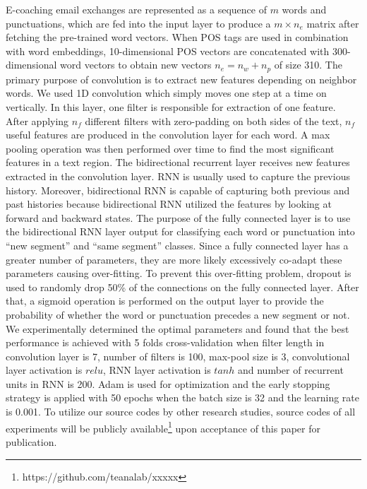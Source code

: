 \documentclass{amia}
\begin{document}
E-coaching email exchanges are represented as a sequence of $m$ words and punctuations, which are fed into the input layer to produce a $m \times n_e$ matrix after fetching the pre-trained word vectors. When POS tags are used in combination with word embeddings, 10-dimensional POS vectors are concatenated with 300-dimensional word vectors to obtain new vectors $n_e = n_w + n_p$ of size 310. The primary purpose of convolution is to extract new features depending on neighbor words. We used 1D convolution which simply moves one step at a time on vertically. In this layer, one filter is responsible for extraction of one feature. After applying $n_f$ different filters with zero-padding on both sides of the text, $n_f$ useful features are produced in the convolution layer for each word. A max pooling operation was then performed over time to find the most significant features in a text region. The bidirectional recurrent layer receives new features extracted in the convolution layer. RNN is usually used to capture the previous history. Moreover, bidirectional RNN is capable of capturing both previous and past histories because bidirectional RNN utilized the features by looking at forward and backward states. The purpose of the fully connected layer is to use the bidirectional RNN layer output for classifying each word or punctuation into ``new segment'' and ``same segment'' classes. Since a fully connected layer has a greater number of parameters, they are more likely excessively co-adapt these parameters causing over-fitting. To prevent this over-fitting problem, dropout is used to randomly drop 50\% of the connections on the fully connected layer. After that, a sigmoid operation is performed on the output layer to provide the probability of whether the word or punctuation precedes a new segment or not. We experimentally determined the optimal parameters and found that the best performance is achieved with 5 folds cross-validation when filter length in convolution layer is 7, number of filters is 100, max-pool size is 3, convolutional layer activation is $relu$, RNN layer activation is $tanh$ and number of recurrent units in RNN is 200. Adam\cite{kingma2014adam} is used for optimization and the early stopping strategy is applied with 50 epochs when the batch size is 32 and the learning rate is 0.001. To utilize our source codes by other research studies, source codes of all experiments will be publicly available\footnote{https://github.com/teanalab/xxxxx} upon acceptance of this paper for publication.
  
\end{document}
